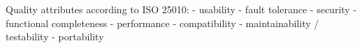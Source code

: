 
Quality attributes according to ISO 25010:
-    usability
-    fault tolerance
-    security
-    functional completeness
-    performance
-    compatibility
-    maintainability / testability
-    portability
